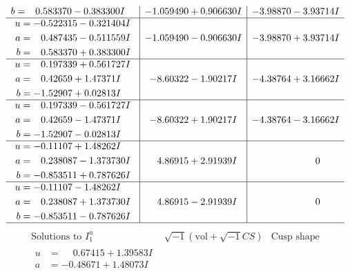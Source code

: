 \documentclass[1p]{elsarticle_modified}
\theoremstyle{definition}
\newcommand{\I}{\sqrt{-1}}
\begin{document}
$$\begin{array}{c|c|c}
\begin{aligned}
b &= \phantom{-}0.583370 - 0.383300 I\end{aligned}
 & -1.059490 + 0.906630 I & -3.98870 - 3.93714 I \\ \hline\begin{aligned}
u &= -0.522315 - 0.321404 I \\
a &= \phantom{-}0.487435 - 0.511559 I \\
b &= \phantom{-}0.583370 + 0.383300 I\end{aligned}
 & -1.059490 - 0.906630 I & -3.98870 + 3.93714 I \\ \hline\begin{aligned}
u &= \phantom{-}0.197339 + 0.561727 I \\
a &= \phantom{-}0.42659 + 1.47371 I \\
b &= -1.52907 + 0.02813 I\end{aligned}
 & -8.60322 - 1.90217 I & -4.38764 + 3.16662 I \\ \hline\begin{aligned}
u &= \phantom{-}0.197339 - 0.561727 I \\
a &= \phantom{-}0.42659 - 1.47371 I \\
b &= -1.52907 - 0.02813 I\end{aligned}
 & -8.60322 + 1.90217 I & -4.38764 - 3.16662 I \\ \hline\begin{aligned}
u &= -0.11107 + 1.48262 I \\
a &= \phantom{-}0.238087 - 1.373730 I \\
b &= -0.853511 + 0.787626 I\end{aligned}
 & \phantom{-}4.86915 + 2.91939 I & \phantom{-0.000000 } 0 \\ \hline\begin{aligned}
u &= -0.11107 - 1.48262 I \\
a &= \phantom{-}0.238087 + 1.373730 I \\
b &= -0.853511 - 0.787626 I\end{aligned}
 & \phantom{-}4.86915 - 2.91939 I & \phantom{-0.000000 } 0\\
 \hline 
 \end{array}$$\newpage$$\begin{array}{c|c|c}  
\text{Solutions to }I^u_{1}& \I (\text{vol} + \sqrt{-1}CS) & \text{Cusp shape}\\
 \hline 
\begin{aligned}
u &= \phantom{-}0.67415 + 1.39583 I \\
a &= -0.48671 + 1.48073 I \\

\end{aligned}
\end{array}$$
\end{document}
